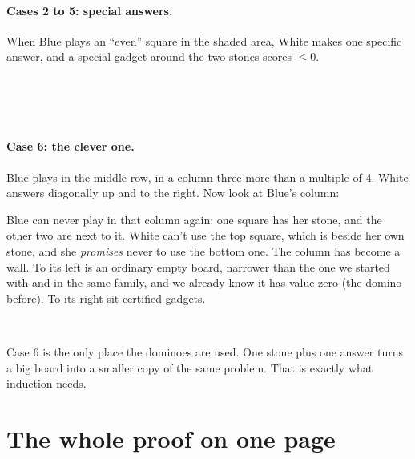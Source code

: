 \documentclass[11pt]{article}
\begin{document}
\begin{center}
\end{center}

\paragraph{Cases 2 to 5: special answers.}
When Blue plays an ``even'' square in the shaded area, White makes one specific
answer, and a special gadget around the two stones scores $\le 0$.

\begin{center}
\\[8pt]
\\[8pt]
\\[8pt]
\end{center}

\paragraph{Case 6: the clever one.}
Blue plays in the middle row, in a column three more than a multiple of 4.
White answers diagonally up and to the right. Now look at Blue's column:

\begin{center}
\end{center}

Blue can never play in that column again: one square has her stone, and the
other two are next to it. White can't use the top square, which is beside her
own stone, and she \emph{promises} never to use the bottom one. The column has
become a wall. To its left is an ordinary empty board, narrower than the one
we started with and in the same family, and we already know it has value zero
(the domino before). To its right sit certified gadgets.

\begin{center}
\\[8pt]
\end{center}

\begin{idea}
Case 6 is the only place the dominoes are used. One stone plus one answer
turns a big board into a smaller copy of the same problem. That is exactly
what induction needs.
\end{idea}

\section{The whole proof on one page}
\end{document}

